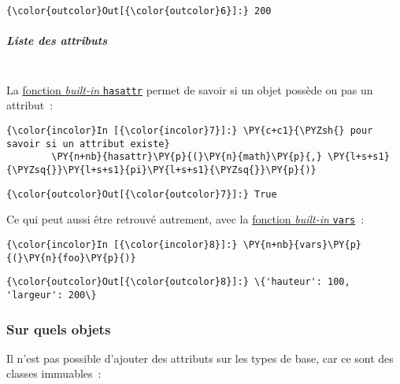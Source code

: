 \begin{Verbatim}[commandchars=\\\{\}]
{\color{outcolor}Out[{\color{outcolor}6}]:} 200
\end{Verbatim}
            
    \hypertarget{liste-des-attributs}{%
\subparagraph{Liste des attributs\\\\}\label{liste-des-attributs}}

    La
\href{https://docs.python.org/3/library/functions.html\#hasattr}{fonction
\emph{built-in} \texttt{hasattr}} permet de savoir si un objet possède
ou pas un attribut~:

    \begin{Verbatim}[commandchars=\\\{\}]
{\color{incolor}In [{\color{incolor}7}]:} \PY{c+c1}{\PYZsh{} pour savoir si un attribut existe}
        \PY{n+nb}{hasattr}\PY{p}{(}\PY{n}{math}\PY{p}{,} \PY{l+s+s1}{\PYZsq{}}\PY{l+s+s1}{pi}\PY{l+s+s1}{\PYZsq{}}\PY{p}{)}
\end{Verbatim}


\begin{Verbatim}[commandchars=\\\{\}]
{\color{outcolor}Out[{\color{outcolor}7}]:} True
\end{Verbatim}
            
    Ce qui peut aussi être retrouvé autrement, avec la
\href{https://docs.python.org/3/library/functions.html\#vars}{fonction
\emph{built-in} \texttt{vars}}~:

    \begin{Verbatim}[commandchars=\\\{\}]
{\color{incolor}In [{\color{incolor}8}]:} \PY{n+nb}{vars}\PY{p}{(}\PY{n}{foo}\PY{p}{)}
\end{Verbatim}


\begin{Verbatim}[commandchars=\\\{\}]
{\color{outcolor}Out[{\color{outcolor}8}]:} \{'hauteur': 100, 'largeur': 200\}
\end{Verbatim}
            
    \hypertarget{sur-quels-objets}{%
\subsubsection{Sur quels objets}\label{sur-quels-objets}}

    Il n'est pas possible d'ajouter des attributs sur les types de base, car
ce sont des classes immuables~:

